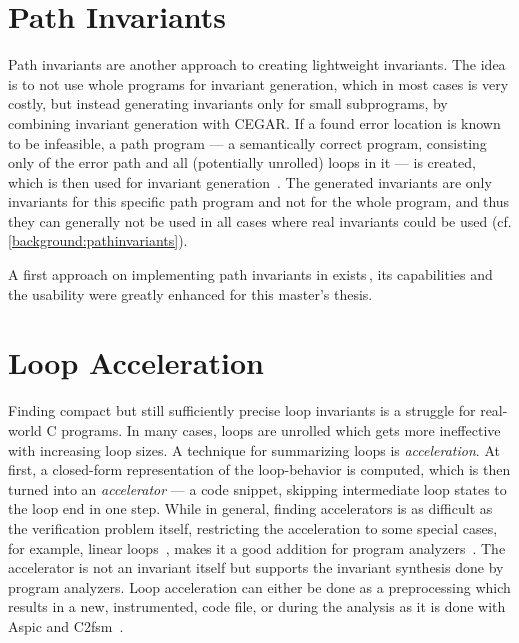 \section{Path Invariants}\label{related:pathInv}
Path invariants are another approach to creating lightweight invariants. The idea is to not
use whole programs for invariant generation, which in most cases is very costly, but instead
generating invariants only for small subprograms, by combining
invariant generation with \ac{CEGAR}. If a found error location is known to be
infeasible, a path program --- a semantically correct program, consisting only of the error
path and all (potentially unrolled) loops in it --- is created, which is then used for
invariant generation~\cite{Beyer:PathInvariants}. The generated invariants are only
invariants for this specific path program and not for the whole program, and thus they can
generally not be used in all cases where real invariants could be used (cf.
\autoref{background:pathinvariants}).

A first approach on implementing path invariants in \CPAchecker{} exists\,, its
capabilities and the usability were greatly enhanced for this master's thesis.

\section{Loop Acceleration}
Finding compact but still sufficiently precise loop invariants is a struggle for
real-world C programs. In many cases, loops are unrolled which gets more ineffective with
increasing loop sizes. A technique for summarizing loops is \emph{acceleration}. At
first, a closed-form representation of the loop-behavior is computed, which is then turned
into an \emph{accelerator} --- a code snippet, skipping intermediate loop states to the
loop end in one step. While in general, finding accelerators is as difficult as the
verification problem itself, restricting the acceleration to some special cases, for example,
linear loops~\cite{Jeannet:LoopAcceleration}, makes it a good addition for program
analyzers~\cite{Madhukar:LoopAcceleration}. The accelerator is not an invariant itself but
supports the invariant synthesis done by program analyzers. Loop acceleration can either
be done as a preprocessing which results in a new, instrumented, code file, or 
during the analysis as it is done with Aspic and C2fsm~\cite{Feautrier:LoopAcceleration}.

